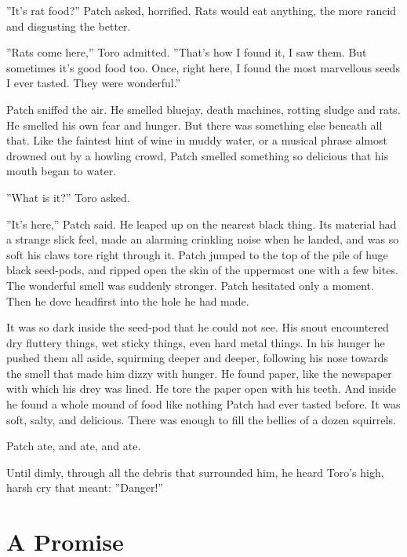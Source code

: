 \documentclass[12pt]{book}
\begin{document}
 ''It's rat food?'' Patch asked, horrified. Rats would eat anything, the more rancid and disgusting the better.\par
 ''Rats come here,'' Toro admitted. ''That's how I found it, I saw them. But sometimes it's good food too. Once, right here, I found the most marvellous seeds I ever tasted. They were wonderful.''\par
 Patch sniffed the air. He smelled bluejay, death machines, rotting sludge and rats. He smelled his own fear and hunger. But there was something else beneath all that. Like the faintest hint of wine in muddy water, or a musical phrase almost drowned out by a howling crowd, Patch smelled something so delicious that his mouth began to water.\par
 ''What is it?'' Toro asked.\par
 ''It's here,'' Patch said. He leaped up on the nearest black thing. Its material had a strange slick feel, made an alarming crinkling noise when he landed, and was so soft his claws tore right through it. Patch jumped to the top of the pile of huge black seed-pods, and ripped open the skin of the uppermost one with a few bites. The wonderful smell was suddenly stronger. Patch hesitated only a moment. Then he dove headfirst into the hole he had made.\par
 It was so dark inside the seed-pod that he could not see. His snout encountered dry fluttery things, wet sticky things, even hard metal things. In his hunger he pushed them all aside, squirming deeper and deeper, following his nose towards the smell that made him dizzy with hunger. He found paper, like the newspaper with which his drey was lined. He tore the paper open with his teeth. And inside he found a whole mound of food like nothing Patch had ever tasted before. It was soft, salty, and delicious. There was enough to fill the bellies of a dozen squirrels.\par
Patch ate, and ate, and ate.\par
Until dimly, through all the debris that surrounded him, he heard Toro's high, harsh cry that meant: ''Danger!''\par

\section{A Promise}
\end{document}
